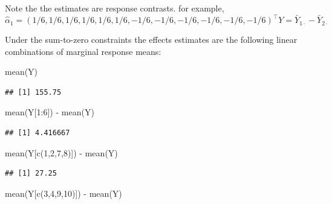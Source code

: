 \documentclass[
]{book}
\newenvironment{Shaded}{\begin{snugshade}}{\end{snugshade}}
\newcommand{\DecValTok}[1]{\textcolor[rgb]{0.00,0.00,0.81}{#1}}
\newcommand{\FunctionTok}[1]{\textcolor[rgb]{0.00,0.00,0.00}{#1}}
\newcommand{\NormalTok}[1]{#1}
\newcommand{\SpecialCharTok}[1]{\textcolor[rgb]{0.00,0.00,0.00}{#1}}
\begin{document}
Note the the estimates are response contrasts. for example,
\[  \hat\alpha_1 =  (1/6, 1/6, 1/6, 1/6, 1/6, 1/6, -1/6, -1/6, -1/6, -1/6, -1/6, -1/6)^\top Y = \bar Y_{1\cdot} - \bar Y_{2\cdot} \]

Under the sum-to-zero constraints the effects estimates are the following linear combinations of marginal response means:

\begin{Shaded}
\begin{Highlighting}[]
\FunctionTok{mean}\NormalTok{(Y)}
\end{Highlighting}
\end{Shaded}

\begin{verbatim}
## [1] 155.75
\end{verbatim}

\begin{Shaded}
\begin{Highlighting}[]
\FunctionTok{mean}\NormalTok{(Y[}\DecValTok{1}\SpecialCharTok{:}\DecValTok{6}\NormalTok{]) }\SpecialCharTok{{-}} \FunctionTok{mean}\NormalTok{(Y) }
\end{Highlighting}
\end{Shaded}

\begin{verbatim}
## [1] 4.416667
\end{verbatim}

\begin{Shaded}
\begin{Highlighting}[]
\FunctionTok{mean}\NormalTok{(Y[}\FunctionTok{c}\NormalTok{(}\DecValTok{1}\NormalTok{,}\DecValTok{2}\NormalTok{,}\DecValTok{7}\NormalTok{,}\DecValTok{8}\NormalTok{)]) }\SpecialCharTok{{-}} \FunctionTok{mean}\NormalTok{(Y)}
\end{Highlighting}
\end{Shaded}

\begin{verbatim}
## [1] 27.25
\end{verbatim}

\begin{Shaded}
\begin{Highlighting}[]
\FunctionTok{mean}\NormalTok{(Y[}\FunctionTok{c}\NormalTok{(}\DecValTok{3}\NormalTok{,}\DecValTok{4}\NormalTok{,}\DecValTok{9}\NormalTok{,}\DecValTok{10}\NormalTok{)]) }\SpecialCharTok{{-}} \FunctionTok{mean}\NormalTok{(Y)}
\end{Highlighting}
\end{Shaded}
\end{document}
